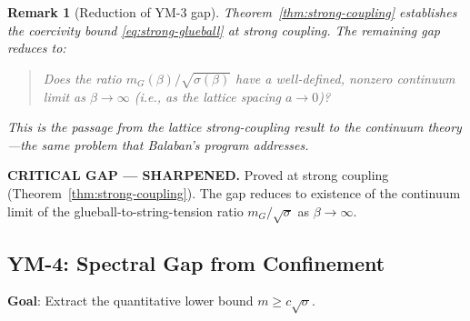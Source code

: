 \documentclass[11pt]{article}
\newtheorem{remark}[theorem]{Remark}
\begin{document}
\begin{remark}[Reduction of YM-3 gap]\label{rem:ym3-reduction}
Theorem~\ref{thm:strong-coupling} establishes the coercivity bound
\eqref{eq:strong-glueball} at strong coupling.  The remaining gap reduces to:
\begin{quote}
\textit{Does the ratio $m_G(\beta)/\sqrt{\sigma(\beta)}$ have a well-defined,
nonzero continuum limit as $\beta \to \infty$ (i.e., as the lattice spacing
$a \to 0$)?}
\end{quote}
This is the passage from the lattice strong-coupling result to the continuum
theory---the same problem that Balaban's program \cite{Balaban} addresses.
\end{remark}

\textbf{CRITICAL GAP --- SHARPENED.}  Proved at strong coupling
(Theorem~\ref{thm:strong-coupling}).  The gap reduces to existence of the
continuum limit of the glueball-to-string-tension ratio $m_G/\sqrt{\sigma}$
as $\beta \to \infty$.

\subsection{YM-4: Spectral Gap from Confinement}
\label{sec:ym4}

\textbf{Goal}: Extract the quantitative lower bound
$m \geq c\sqrt{\sigma}$.
\end{document}
